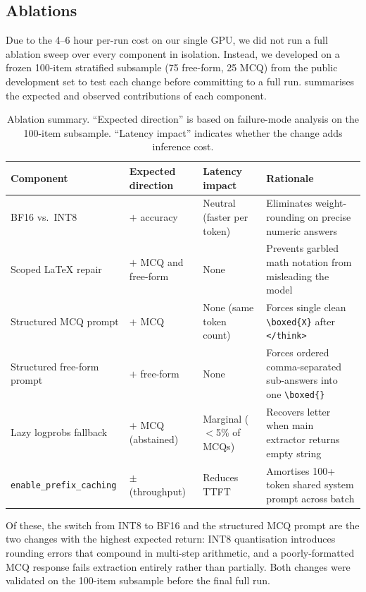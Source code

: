 \documentclass{article}
\begin{document}
\subsection{Ablations}
\label{sec:ablations}

Due to the 4--6 hour per-run cost on our single GPU, we did not run a full
ablation sweep over every component in isolation.
Instead, we developed on a frozen 100-item stratified subsample
(75 free-form, 25 MCQ) from the public development set to test each change
before committing to a full run.
 summarises the expected and observed contributions of
each component.

\begin{table}[h]
  \caption{Ablation summary. ``Expected direction'' is based on failure-mode
    analysis on the 100-item subsample.  ``Latency impact'' indicates
    whether the change adds inference cost.}
  \label{tab:ablations}
  \centering
  \footnotesize
  \begin{tabular}{llll}
    \toprule
    Component & Expected direction & Latency impact & Rationale \\
    \midrule
    BF16 vs.\ INT8 &
      $+$ accuracy &
      Neutral (faster per token) &
      Eliminates weight-rounding on precise numeric answers \\
    Scoped LaTeX repair &
      $+$ MCQ and free-form &
      None &
      Prevents garbled math notation from misleading the model \\
    Structured MCQ prompt &
      $+$ MCQ &
      None (same token count) &
      Forces single clean \texttt{\textbackslash boxed\{X\}} after \texttt{</think>} \\
    Structured free-form prompt &
      $+$ free-form &
      None &
      Forces ordered comma-separated sub-answers into one \texttt{\textbackslash boxed\{\}} \\
    Lazy logprobs fallback &
      $+$ MCQ (abstained) &
      Marginal ($<$5\% of MCQs) &
      Recovers letter when main extractor returns empty string \\
    \texttt{enable\_prefix\_caching} &
      $\pm$ (throughput) &
      Reduces TTFT &
      Amortises 100+ token shared system prompt across batch \\
    \bottomrule
  \end{tabular}
\end{table}

Of these, the switch from INT8 to BF16 and the structured MCQ prompt are the
two changes with the highest expected return: INT8 quantisation introduces
rounding errors that compound in multi-step arithmetic, and a poorly-formatted
MCQ response fails extraction entirely rather than partially.
Both changes were validated on the 100-item subsample before the final full run.
\end{document}
